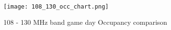 \documentclass[12pt,sts]{report}
\begin{document}
\begin{figure}[ht!]
	\centering
		\texttt{[image: 108\_130\_occ\_chart.png]}
	\caption{108 - 130 MHz band game day Occupancy comparison}
\end{figure}



%
%
%


%
%

%



%





\end{document}
